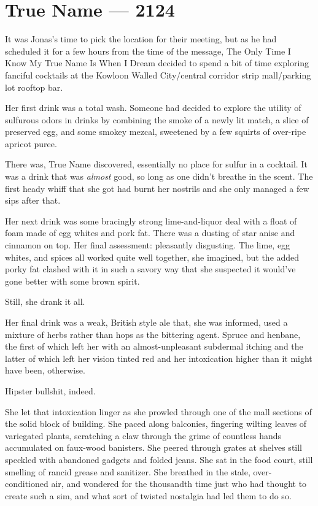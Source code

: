 \hypertarget{true-name-2124}{%
\chapter{True Name — 2124}\label{true-name-2124}}

It was Jonas's time to pick the location for their meeting, but as he had scheduled it for a few hours from the time of the message, The Only Time I Know My True Name Is When I Dream decided to spend a bit of time exploring fanciful cocktails at the Kowloon Walled City/central corridor strip mall/parking lot rooftop bar.

Her first drink was a total wash. Someone had decided to explore the utility of sulfurous odors in drinks by combining the smoke of a newly lit match, a slice of preserved egg, and some smokey mezcal, sweetened by a few squirts of over-ripe apricot puree.

There was, True Name discovered, essentially no place for sulfur in a cocktail. It was a drink that was \emph{almost} good, so long as one didn't breathe in the scent. The first heady whiff that she got had burnt her nostrils and she only managed a few sips after that.

Her next drink was some bracingly strong lime-and-liquor deal with a float of foam made of egg whites and pork fat. There was a dusting of star anise and cinnamon on top. Her final assessment: pleasantly disgusting. The lime, egg whites, and spices all worked quite well together, she imagined, but the added porky fat clashed with it in such a savory way that she suspected it would've gone better with some brown spirit.

Still, she drank it all.

Her final drink was a weak, British style ale that, she was informed, used a mixture of herbs rather than hops as the bittering agent. Spruce and henbane, the first of which left her with an almost-unpleasant subdermal itching and the latter of which left her vision tinted red and her intoxication higher than it might have been, otherwise.

Hipster bullshit, indeed.

She let that intoxication linger as she prowled through one of the mall sections of the solid block of building. She paced along balconies, fingering wilting leaves of variegated plants, scratching a claw through the grime of countless hands accumulated on faux-wood banisters. She peered through grates at shelves still speckled with abandoned gadgets and folded jeans. She sat in the food court, still smelling of rancid grease and sanitizer. She breathed in the stale, over-conditioned air, and wondered for the thousandth time just who had thought to create such a sim, and what sort of twisted nostalgia had led them to do so.

